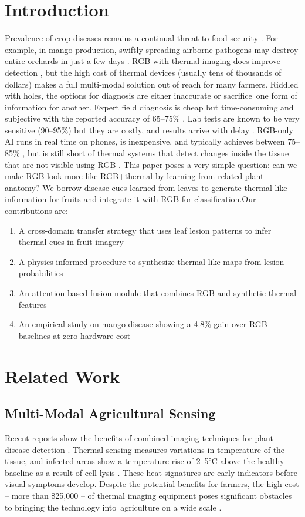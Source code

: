\documentclass[conference]{IEEEtran}
\begin{document}
\section{Introduction}
Prevalence of crop diseases remains a continual threat to food security \cite{fao2021}. For example, in mango production, swiftly spreading airborne pathogens may destroy entire orchards in just a few days \cite{singh2019}. RGB with thermal imaging does improve detection \cite{khanal2017}, but the high cost of thermal devices (usually tens of thousands of dollars) makes a full multi-modal solution out of reach for many farmers.
Riddled with holes, the options for diagnosis are either inaccurate or sacrifice one form of information for another. Expert field diagnosis is cheap but time-consuming and subjective with the reported accuracy of 65–75\% \cite{ferentinos2018}. Lab tests are known to be very sensitive (90–95\%) but they are costly, and results arrive with delay \cite{martinelli2015}. RGB-only AI runs in real time on phones, is inexpensive, and typically achieves between 75–85\% \cite{mohanty2016,pineda2021}, but is still short of thermal systems that detect changes inside the tissue that are not visible using RGB \cite{pineda2021}.
This paper poses a very simple question: can we make RGB look more like RGB+thermal by learning from related plant anatomy? We borrow disease cues learned from leaves to generate thermal-like information for fruits and integrate it with RGB for classification.Our contributions are: 

\begin{enumerate}
    \item A cross-domain transfer strategy that uses leaf lesion patterns to infer thermal cues in fruit imagery
    \item A physics-informed procedure to synthesize thermal-like maps from lesion probabilities
    \item An attention-based fusion module that combines RGB and synthetic thermal features
    \item An empirical study on mango disease showing a 4.8\% gain over RGB baselines at zero hardware cost
\end{enumerate}

\section{Related Work}

\subsection{Multi-Modal Agricultural Sensing}
Recent reports show the benefits of combined imaging techniques for plant disease detection \cite{maimaitijiang2020}. Thermal sensing measures variations in temperature of the tissue, and infected areas show a temperature rise of 2–5°C above the healthy baseline as a result of cell lysis \cite{mahlein2016}. These heat signatures are early indicators before visual symptoms develop. Despite the potential benefits for farmers, the high cost – more than \$25,000 – of thermal imaging equipment poses significant obstacles to bringing the technology into agriculture on a wide scale \cite{sishodia2020}. 
\end{document}
